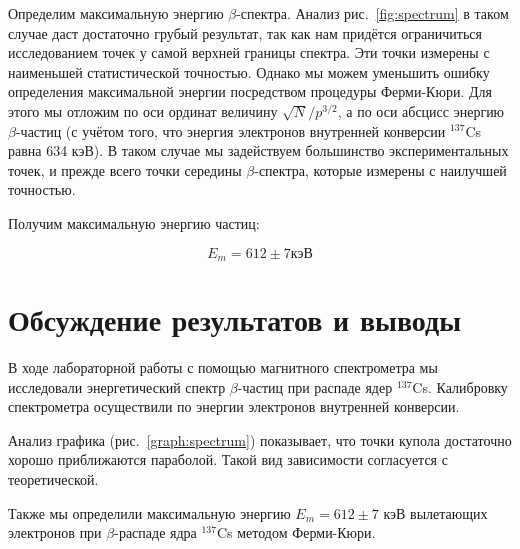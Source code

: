 \documentclass[a4paper, 12pt]{article}
\begin{document}
\begin{figure}[h]
\begin{minipage}{0.4\textwidth}
		    \end{minipage}
		    \begin{minipage}{0.4\textwidth}
		    \end{minipage}
		\end{figure}

		Определим максимальную энергию $\beta$-спектра. Анализ рис.~\ref{fig:spectrum} в таком случае даст достаточно грубый результат, так как нам придётся ограничиться исследованием точек у самой верхней границы спектра. Эти точки измерены с наименьшей статистической точностью. Однако мы можем уменьшить ошибку определения максимальной энергии посредством процедуры Ферми-Кюри. Для этого мы отложим по оси ординат величину $\sqrt{N}/p^{3/2}$, а по оси абсцисс энергию $\beta$-частиц (с учётом того, что энергия электронов внутренней конверсии $^{137}$Cs равна 634 кэВ). В таком случае мы задействуем большинство экспериментальных точек, и прежде всего точки середины $\beta$-спектра, которые измерены с наилучшей точностью.
		
		Получим максимальную энергию частиц:
		
		\[E_{m} = 612\pm 7 \text{кэВ}\]
		
		
		
\section*{Обсуждение результатов и выводы}
	В ходе лабораторной работы с помощью магнитного спектрометра мы исследовали энергетический спектр $\beta$-частиц при распаде ядер $^{137}$Cs. Калибровку спектрометра осуществили по энергии электронов внутренней конверсии.
	
	Анализ графика (рис.~\ref{graph:spectrum}) показывает, что точки купола достаточно хорошо приближаются параболой. Такой вид зависимости согласуется с теоретической.
	
	Также мы определили максимальную энергию $E_m = 612 \pm 7$ кэВ вылетающих электронов при $\beta$-распаде ядра $^{137}$Cs методом Ферми-Кюри.
\end{document}
